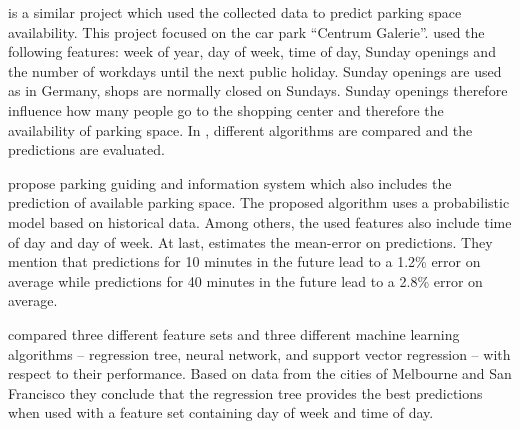 \cite{parkendd} is a similar project which used the collected data to predict parking space availability. This project focused on the car park ``Centrum Galerie''. \cite{parkendd} used the following features: week of year, day of week, time of day, Sunday openings and the number of workdays until the next public holiday. Sunday openings are used as in Germany, shops are normally closed on Sundays. Sunday openings therefore influence how many people go to the shopping center and therefore the availability of parking space. In \cite{parkendd}, different algorithms are compared and the predictions are evaluated.

\cite{Rajabioun2013} propose parking guiding and
information system which also includes the prediction of available parking space. The proposed algorithm uses a probabilistic model based on historical data. Among others, the used features also include time of day and day of week. At last, \cite{Rajabioun2013} estimates the mean-error on predictions. They mention that predictions for 10 minutes in the future lead to a 1.2\% error on average while predictions for 40 minutes in the future lead to a 2.8\% error on average.

\cite{Zheng2015} compared three different feature sets and three different machine learning algorithms -- regression tree, neural network, and support vector regression -- with respect to their performance. Based on data from the cities of Melbourne and San Francisco they conclude that the regression tree provides the best predictions when used with a feature set containing day of week and time of day.  